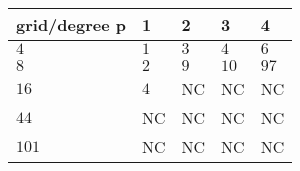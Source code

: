 \begin{tabular}{lllll}
\hline
 grid/degree p   & 1   & 2   & 3    & 4    \\
\hline
 $4$             & $1$ & $3$ & $4$  & $6$  \\
 $8$             & $2$ & $9$ & $10$ & $97$ \\
 $16$            & $4$ & NC  & NC   & NC   \\
 $44$            & NC  & NC  & NC   & NC   \\
 $101$           & NC  & NC  & NC   & NC   \\
\hline
\end{tabular}